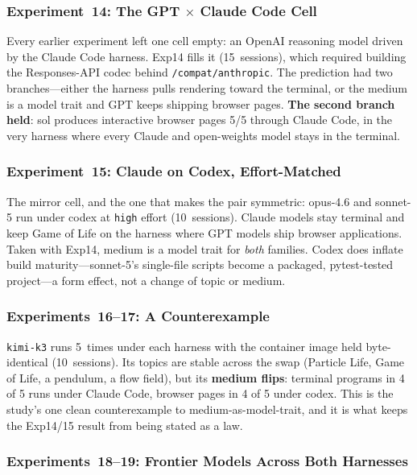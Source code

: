 \documentclass{article}
\begin{document}
\subsubsection{Experiment~14: The GPT $\times$ Claude Code Cell}
\label{sec:exp14}

Every earlier experiment left one cell empty: an OpenAI reasoning
model driven by the Claude Code harness. Exp14 fills it
(15~sessions), which required building the Responses-API codec
behind \texttt{/compat/anthropic}. The prediction had two
branches---either the harness pulls rendering toward the terminal,
or the medium is a model trait and GPT keeps shipping browser
pages. \textbf{The second branch held}: sol produces interactive
browser pages 5/5 through Claude Code, in the very harness where
every Claude and open-weights model stays in the terminal.

\subsubsection{Experiment~15: Claude on Codex, Effort-Matched}
\label{sec:exp15}

The mirror cell, and the one that makes the pair symmetric:
opus-4.6 and sonnet-5 run under codex at \texttt{high} effort
(10~sessions). Claude models stay terminal and keep Game of Life
on the harness where GPT models ship browser applications. Taken
with Exp14, medium is a model trait for \emph{both} families.
Codex does inflate build maturity---sonnet-5's single-file scripts
become a packaged, pytest-tested project---a form effect, not a
change of topic or medium.

\subsubsection{Experiments~16--17: A Counterexample}
\label{sec:exp1617}

\texttt{kimi-k3} runs 5~times under each harness with the
container image held byte-identical (10~sessions). Its topics are
stable across the swap (Particle Life, Game of Life, a pendulum,
a flow field), but its \textbf{medium flips}: terminal programs in
4 of 5 runs under Claude Code, browser pages in 4 of 5 under
codex. This is the study's one clean counterexample to
medium-as-model-trait, and it is what keeps the Exp14/15 result
from being stated as a law.

\subsubsection{Experiments~18--19: Frontier Models Across Both Harnesses}
\label{sec:exp1819}
\end{document}

